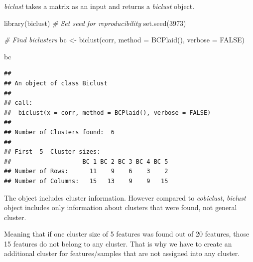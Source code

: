 \documentclass[
]{book}
\newenvironment{Shaded}{\begin{snugshade}}{\end{snugshade}}
\newcommand{\AttributeTok}[1]{\textcolor[rgb]{0.77,0.63,0.00}{#1}}
\newcommand{\CommentTok}[1]{\textcolor[rgb]{0.56,0.35,0.01}{\textit{#1}}}
\newcommand{\ConstantTok}[1]{\textcolor[rgb]{0.00,0.00,0.00}{#1}}
\newcommand{\DecValTok}[1]{\textcolor[rgb]{0.00,0.00,0.81}{#1}}
\newcommand{\FunctionTok}[1]{\textcolor[rgb]{0.00,0.00,0.00}{#1}}
\newcommand{\NormalTok}[1]{#1}
\newcommand{\OtherTok}[1]{\textcolor[rgb]{0.56,0.35,0.01}{#1}}
\begin{document}
\emph{biclust} takes a matrix as an input and returns a \emph{biclust} object.

\begin{Shaded}
\begin{Highlighting}[]
\FunctionTok{library}\NormalTok{(biclust)}
\CommentTok{\# Set seed for reproducibility}
\FunctionTok{set.seed}\NormalTok{(}\DecValTok{3973}\NormalTok{)}

\CommentTok{\# Find biclusters}
\NormalTok{bc }\OtherTok{\textless{}{-}} \FunctionTok{biclust}\NormalTok{(corr, }\AttributeTok{method =} \FunctionTok{BCPlaid}\NormalTok{(), }\AttributeTok{verbose =} \ConstantTok{FALSE}\NormalTok{)}

\NormalTok{bc}
\end{Highlighting}
\end{Shaded}

\begin{verbatim}
## 
## An object of class Biclust 
## 
## call:
##  biclust(x = corr, method = BCPlaid(), verbose = FALSE)
## 
## Number of Clusters found:  6 
## 
## First  5  Cluster sizes:
##                    BC 1 BC 2 BC 3 BC 4 BC 5
## Number of Rows:      11    9    6    3    2
## Number of Columns:   15   13    9    9   15
\end{verbatim}

The object includes cluster information. However compared to
\emph{cobiclust}, \emph{biclust} object includes only information about clusters
that were found, not general cluster.

Meaning that if one cluster size of 5 features was found out of 20 features,
those 15 features do not belong to any cluster. That is why we have to create an
additional cluster for features/samples that are not assigned into any cluster.
\end{document}
